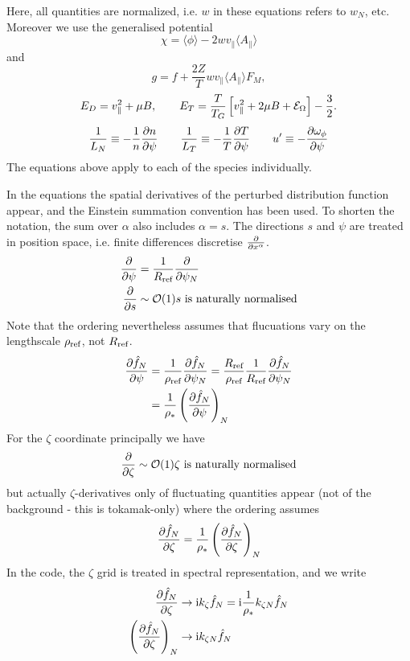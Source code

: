 Here, all quantities are normalized, i.e. $w$ in these equations 
refers to $w_N$, etc.
Moreover we use the generalised potential 
\begin{equation} 
\chi = {\langle \phi \rangle} - 2 w v_{\parallel} {\langle A_{\parallel} \rangle}  %
\end{equation} 
and 
\begin{equation} 
g = f + \frac{2 Z }{ T} w v_{\parallel} {\langle A_{\parallel} \rangle} F_{M}, 
\end{equation}
\begin{equation}
E_D = v_{\parallel}^2 + \mu B , \qquad 
E_T = \frac{T }{ T_G} \left [ v_{\parallel}^2 + 2 \mu B  + {\cal E}_\Omega \right ]  - \frac{3}{ 2} .
\end{equation}
\begin{equation} 
\frac{1 }{ L_N} \equiv - \frac{1 }{ n}\frac{\partial  n }{\partial \psi} \qquad 
\frac{1 }{ L_T} \equiv - \frac{1 }{ T}\frac{\partial  T }{\partial \psi} \qquad 
u^\prime      \equiv - \frac{\partial  \omega_\phi }{\partial \psi} 
\end{equation}
The equations above apply to each of the species individually. 

In the equations the spatial derivatives of the perturbed distribution function appear, and the Einstein summation convention has been used. 
To shorten the notation, the sum over $\alpha$ also includes $\alpha = s$.
The directions $s$ and $\psi$ are treated in position space, i.e. finite differences discretise  $\frac{\partial }{\partial x^\alpha}$.
\begin{align}
  \frac{\partial }{\partial \psi} &= \frac{1}{R_{\text{ref}}} \frac{\partial }{\partial \psi_N} \\
\frac{\partial }{\partial s} &\sim \mathcal{O}(1)\text{$s$ is naturally normalised}
\label{eq:global-s-normalisation}
\end{align}
Note that the ordering nevertheless assumes that flucuations vary on the lengthscale $\rho_{\text{ref}}$, not $R_{\text{ref}}$.
\begin{align}
\frac{\partial \hat f_N}{\partial \psi}
&= \frac{1}{\rho_{\text{ref}}} \frac{\partial \hat f_N}{\partial \psi_N} 
= \frac{R_{\text{ref}}}{\rho_{\text{ref}}} \frac{1}{R_{\text{ref}}}\frac{\partial \hat f_N}{\partial \psi_N} \\
&= \frac{1}{\rho_*}\left(\frac{\partial \hat f_N}{\partial \psi}\right)_N
\label{eq:global-dpsi-normalisation}
\end{align}
For the $\zeta$ coordinate principally we have
\begin{align}
  \frac{\partial }{\partial \zeta} \sim \mathcal{O}(1)\text{$\zeta$ is naturally normalised}
\end{align}
but actually $\zeta$-derivatives only of fluctuating quantities appear
(not of the background - this is tokamak-only)
where the ordering assumes
\begin{align}
  \frac{\partial \hat f_N}{\partial \zeta} = \frac{1}{\rho_*}\left(\frac{\partial \hat f_N}{\partial \zeta}\right)_N
\end{align}
In the code, the $\zeta$ grid is treated in spectral representation, and we write
\begin{align} 
\frac{\partial \hat f_N}{\partial \zeta} &\rightarrow {\rm i} k_\zeta \hat f_N = {\rm i} \frac{1}{\rho_*}k_{\zeta N} \hat f_N
\label{eq:global-kzeta-normalisation}
\\
\left(\frac{\partial \hat f_N}{\partial \zeta}\right)_N &\rightarrow {\rm i} k_{\zeta N} \hat f_N
\end{align}

